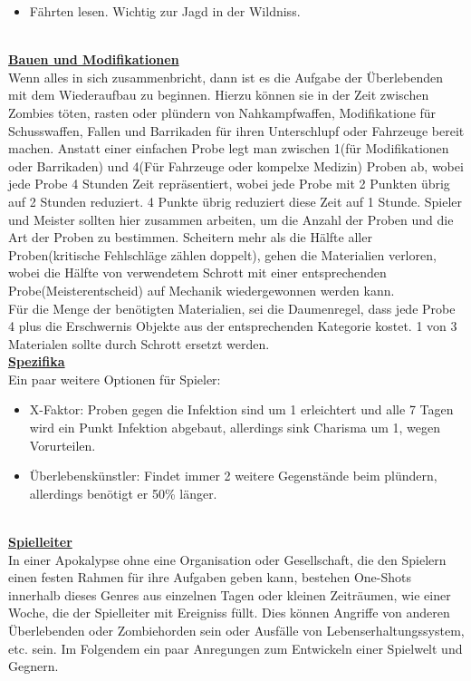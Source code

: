 \documentclass[twoside,a4paper]{minimal}
\begin{document}
\begin{multicols*}{3}
\begin{itemize}
\item Fährten lesen. Wichtig zur Jagd in der Wildniss.
\end{itemize}
\textbf{\uline{\\Bauen und Modifikationen}}
\\Wenn alles in sich zusammenbricht, dann ist es die Aufgabe der Überlebenden mit dem Wiederaufbau zu beginnen. Hierzu können sie in der Zeit zwischen Zombies töten, rasten oder plündern von Nahkampfwaffen, Modifikatione für Schusswaffen, Fallen und Barrikaden für ihren Unterschlupf oder Fahrzeuge bereit machen. Anstatt einer einfachen Probe legt man zwischen 1(für Modifikationen oder Barrikaden) und 4(Für Fahrzeuge oder kompelxe Medizin) Proben ab, wobei jede Probe 4 Stunden Zeit repräsentiert, wobei jede Probe mit 2 Punkten übrig auf 2 Stunden reduziert. 4 Punkte übrig reduziert diese Zeit auf 1 Stunde. Spieler und Meister sollten hier zusammen arbeiten, um die Anzahl der Proben und die Art der Proben zu bestimmen. Scheitern mehr als die Hälfte aller Proben(kritische Fehlschläge zählen doppelt), gehen die Materialien verloren, wobei die Hälfte von verwendetem Schrott mit einer entsprechenden Probe(Meisterentscheid) auf Mechanik wiedergewonnen werden kann. 
\\Für die Menge der benötigten Materialien, sei die Daumenregel, dass jede Probe 4 plus die Erschwernis Objekte aus der entsprechenden Kategorie kostet. 1 von 3 Materialen sollte durch Schrott ersetzt werden.
\textbf{\uline{\\Spezifika}}
\\Ein paar weitere Optionen für Spieler:
\begin{itemize}
\item X-Faktor: Proben gegen die Infektion sind um 1 erleichtert und alle 7 Tagen wird ein Punkt Infektion abgebaut, allerdings sink Charisma um 1, wegen Vorurteilen.
\item Überlebenskünstler: Findet immer 2 weitere Gegenstände beim plündern, allerdings benötigt er 50\% länger.
\end{itemize}
\textbf{\uline{\\Spielleiter}}
\\In einer Apokalypse ohne eine Organisation oder Gesellschaft, die den Spielern einen festen Rahmen für ihre Aufgaben geben kann, bestehen One-Shots innerhalb dieses Genres aus einzelnen Tagen oder kleinen Zeiträumen, wie einer Woche, die der Spielleiter mit Ereigniss füllt. Dies können Angriffe von anderen Überlebenden oder Zombiehorden sein oder Ausfälle von Lebenserhaltungssystem, etc. sein. Im Folgendem ein paar Anregungen zum Entwickeln einer Spielwelt und Gegnern. 

\end{multicols*}
\end{document}
